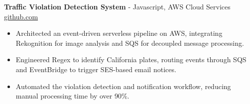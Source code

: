 \documentclass[11pt]{article}       %
\begin{document}

\textbf{Traffic Violation Detection System}{ - Javascript, AWS Cloud Services} \hfill \href{https://github.com/Monica20030707/AWS_rekonigition-N-read-database}{github.com} \\
\vspace{-9pt}
\begin{itemize}
  \item Architected an event-driven serverless pipeline on AWS, integrating Rekognition for image analysis and SQS for decoupled message processing.
  \item Engineered Regex to identify California plates, routing events through SQS and EventBridge to trigger SES-based email notices.
  \item Automated the violation detection and notification workflow, reducing manual processing time by over 90\%.
\end{itemize}
\end{document}
